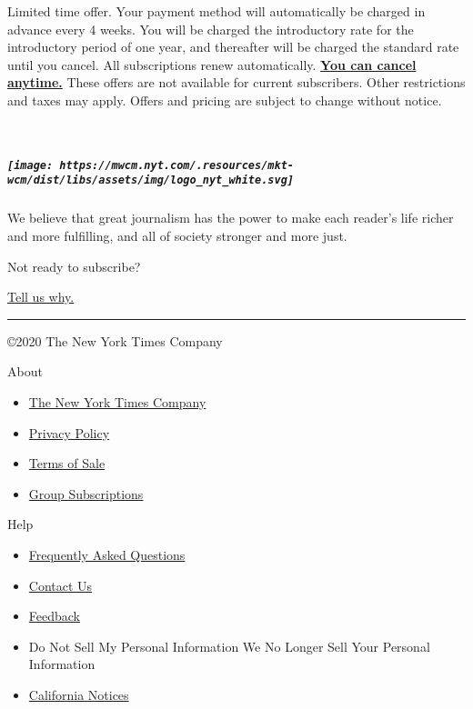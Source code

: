 Limited time offer. Your payment method will automatically be charged in
advance every 4 weeks. You will be charged the introductory rate for the
introductory period of one year, and thereafter will be charged the
standard rate until you cancel. All subscriptions renew automatically.
\textbf{\href{https://help.nytimes.com/hc/en-us/articles/115014893968-Terms-of-sale\#cancel}{You
can cancel anytime.}} These offers are not available for current
subscribers. Other restrictions and taxes may apply. Offers and pricing
are subject to change without notice.

~

\hypertarget{the-new-york-times}{%
\subparagraph{\texorpdfstring{\protect\texttt{[image: https://mwcm.nyt.com/.resources/mkt-wcm/dist/libs/assets/img/logo\_nyt\_white.svg]}}{The New York Times}}\label{the-new-york-times}}

We believe that great journalism has the power to make each reader's
life richer and more fulfilling, and all of society stronger and more
just.

Not ready to subscribe?

\href{http://nyt.qualtrics.com/jfe/form/SV_6xph8FSrgDdOgap?}{Tell us
why.}

\begin{center}\rule{0.5\linewidth}{\linethickness}\end{center}

©2020 The New York Times Company

About

\begin{itemize}
\tightlist
\item
  \href{https://www.nytco.com/}{The New York Times Company}
\item
  \href{https://www.nytimes.com/privacy}{Privacy Policy}
\item
  \href{https://www.nytimes.com/content/help/rights/sale/terms-of-sale.html}{Terms
  of Sale}
\item
  \href{https://nytimesgroupsubscriptions.com/?Pardot_Campaign_Code_Form_Input=74KRY}{Group
  Subscriptions}
\end{itemize}

Help

\begin{itemize}
\tightlist
\item
  \href{https://www.nytimes.com/content/help/account/purchases/subscriptions-and-purchases.html}{Frequently
  Asked Questions}
\item
  \href{https://help.nytimes.com/hc/en-us/articles/115015385887-Contact-us}{Contact
  Us}
\item
  \href{https://myaccount.nytimes.com/membercenter/feedback.html}{Feedback}
\item
  Do Not Sell My Personal Information We No Longer Sell Your Personal
  Information
\item
  \href{https://www.nytimes.com/privacy/california-notice}{California
  Notices}
\end{itemize}
